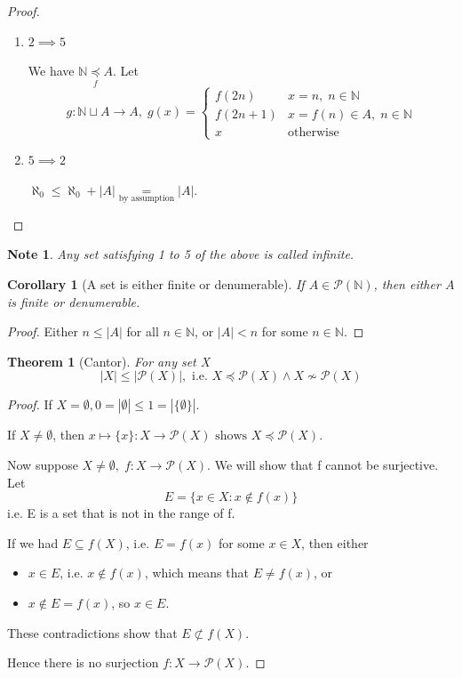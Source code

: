 \documentclass[11pt, oneside]{book}
\theoremstyle{break}
\newtheorem{thm}{Theorem}[section]
\newtheorem*{proof}{Proof}
\newtheorem{crly}{Corollary}[section]
\newtheorem*{note}{Note}
\newcommand{\bb}[1]{\mathbb{#1}}			%
\begin{document}
\begin{proof}
\begin{enumerate}
		\item $2 \implies 5$

			We have $\bb{N} \underset{f}{\preceq} A$. Let
			\begin{equation}
				g : \bb{N} \sqcup A \to A, \; g(x) = 
					\begin{cases}
						f(2n) & x = n, \; n \in \bb{N} \\
						f(2n + 1) & x = f(n) \in A, \; n \in \bb{N} \\
						x & \text{otherwise}
					\end{cases}
			\end{equation}

		\item $5 \implies 2$

			$\aleph_0 \leq \aleph_0 + |A| \underset{\text{by assumption}}{=} |A|$.
	\end{enumerate}
\end{proof}

\begin{note}
	Any set satisfying 1 to 5 of the above is called infinite.
\end{note}

\begin{crly}[A set is either finite or denumerable]
	If $A \in \mathcal{P}(\bb{N})$, then either $A$ is finite or denumerable.
\end{crly}

\begin{proof}
	Either $n \leq |A|$ for all $n \in \bb{N}$, or $|A| < n$ for some $n \in \bb{N}$.
\end{proof}

\begin{thm}[Cantor]
	For any set X
	\begin{equation}
		|X| \leq |\mathcal{P}(X)|, \text{ i.e. } X \preceq \mathcal{P}(X) \land X \not\sim \mathcal{P}(X)
	\end{equation}
\end{thm}

\begin{proof}
	If $X = \emptyset, 0 = |\emptyset| \leq 1 = |\{\emptyset\}|$.

	If $X \neq \emptyset$, then $x \mapsto \{x\} : X \to \mathcal{P}(X) \text{ shows } X \preceq \mathcal{P}(X)$.

	Now suppose $X \neq \emptyset, \; f: X \to \mathcal{P}(X)$. We will show that f cannot be surjective. Let
	\begin{equation}
		E = \{x \in X : x \notin f(x)\}
	\end{equation}
	i.e. E is a set that is not in the range of f.

	If we had $E \subseteq f(X)$, i.e. $E = f(x)$ for some $x \in X$, then either
	\begin{itemize}
		\item $x \in E$, i.e. $x \notin f(x)$, which means that $E \neq f(x)$, or
		\item $x \notin E = f(x)$, so $x \in E$.
	\end{itemize}
	These contradictions show that $E \nsubset f(X)$.

	Hence there is no surjection $f: X \to \mathcal{P}(X)$.
\end{proof}
\end{document}
